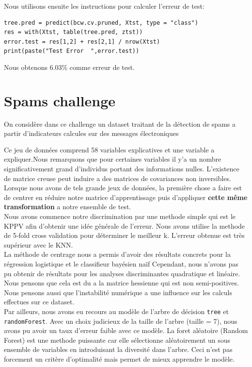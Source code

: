 \documentclass[10pt]{article}
\begin{document}
Nous utilisons ensuite les instructions pour calculer l'erreur de test:
\begin{lstlisting}
tree.pred = predict(bcw.cv.pruned, Xtst, type = "class")
res = with(Xtst, table(tree.pred, ztst))
error.test = res[1,2] + res[2,1] / nrow(Xtst)
print(paste("Test Error  ",error.test))
\end{lstlisting}

Nous obtenons 6.03\% comme erreur de test.

\section{Spams challenge}

On considère dans ce challenge un dataset traitant de la détection de spams a partir d'indicateurs calcules sur des messages électroniques 

Ce jeu de données comprend 58 variables explicatives et une variable a expliquer.Nous remarquons que pour certaines variables il y'a un nombre significativement grand d'individus portant des informations nulles. 
L'existence de matrice creuse peut induire a des  matrices de covariances non inversibles. 
Lorsque nous avons de tels grande jeux de données, la première chose a faire est de centrer en réduire notre matrice d'apprentissage puis d'appliquer \textbf{cette même transformation} a notre ensemble de test.\\ 

Nous avons commence notre discrimination par une methode simple qui est le KPPV afin d'obtenir une idée générale de l'erreur. Nous avons utilise la methode de 5-fold cross validation pour déterminer le meilleur k. L'erreur obtenue est très supérieur avec le KNN.\\

La méthode de centrage nous a permis d'avoir des résultats concrets pour la régression logistique et le classifieur bayésien naïf Cependant, nous n'avons pas pu obtenir de résultats  pour les analyses discriminantes quadratique et linéaire. Nous pensons que cela est du a la matrice hessienne qui est non semi-positives. Nous pensons aussi que l'instabilité numérique a une influence sur les calculs effectues sur ce dataset.\\

Par ailleurs, nous avons eu recours au modèle de l'arbre de décision \texttt{tree} et \texttt{randomForest}. Avec un choix judicieux de la taille de l'arbre (taille = 7), nous avons pu avoir un taux d'erreur faible avec ce modèle. La foret aléatoire (Random Forest) est une methode puissante car elle sélectionne aléatoirement un sous ensemble de variables en  introduisant la diversité dans l'arbre. Ceci n'est pas forcement un critère d'optimalité mais permet de mieux apprendre le modèle.
\end{document}
